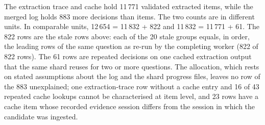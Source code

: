 The extraction trace and cache hold 11\,771 validated extracted items, while the merged log holds 883 more decisions than items. The two counts are in different units. In comparable units, 12\,654 = 11\,832 + 822 and 11\,832 = 11\,771 + 61. The 822 rows are the stale rows above: each of the 20 stale groups equals, in order, the leading rows of the same question as re-run by the completing worker (822 of 822 rows). The 61 rows are repeated decisions on one cached extraction output that the same shard reuses for two or more questions. The allocation, which rests on stated assumptions about the log and the shard progress files, leaves no row of the 883 unexplained; one extraction-trace row without a cache entry and 16 of 43 repeated cache lookups cannot be characterised at item level, and 23 rows have a cache item whose recorded evidence session differs from the session in which the candidate was ingested.
